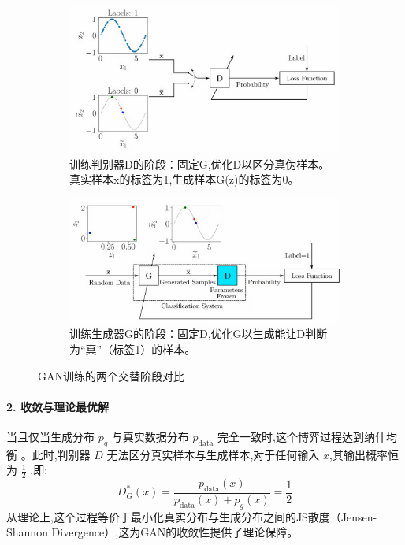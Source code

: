 \begin{itemize}
    \begin{figure}[htbp]
        \centering
        \begin{subfigure}[b]{0.48\textwidth}
            \centering
            \includegraphics[width=\textwidth]{figures/GAN5.png}
            \caption{训练判别器D的阶段：固定G,优化D以区分真伪样本。真实样本x的标签为1,生成样本G(z)的标签为0。}
            \label{fig:gan_train_discriminator}
        \end{subfigure}
        \hfill
        \begin{subfigure}[b]{0.48\textwidth}
            \centering
            \includegraphics[width=\textwidth]{figures/GAN6.png}
            \caption{训练生成器G的阶段：固定D,优化G以生成能让D判断为“真”（标签1）的样本。}
            \label{fig:gan_train_generator}
        \end{subfigure}
        \caption{GAN训练的两个交替阶段对比}
        \label{fig:gan_training_phases}
    \end{figure}

    \paragraph{2. 收敛与理论最优解}
    当且仅当生成分布 $p_g$ 与真实数据分布 $p_{\text{data}}$ 完全一致时,这个博弈过程达到纳什均衡 。此时,判别器 $D$ 无法区分真实样本与生成样本,对于任何输入 $x$,其输出概率恒为 $\frac{1}{2}$ ,即:
    $$ D_{G}^{*}(x) = \frac{p_{\text{data}}(x)}{p_{\text{data}}(x) + p_{g}(x)} = \frac{1}{2} $$
    从理论上,这个过程等价于最小化真实分布与生成分布之间的JS散度（Jensen-Shannon Divergence）,这为GAN的收敛性提供了理论保障。
    

\end{itemize}
